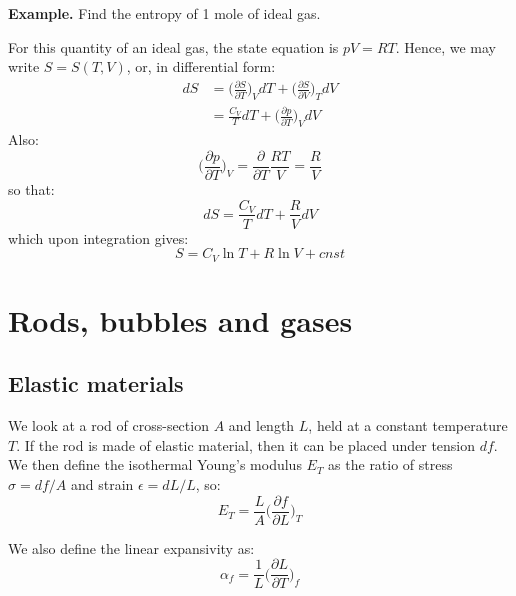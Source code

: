 \documentclass[a4paper,11pt,oneside]{book}
\begin{document}
\begin{strategy}
\textbf{Example.} Find the entropy of 1 mole of ideal gas.
\end{strategy}
\begin{mdframed}
\begin{solution}
For this quantity of an ideal gas, the state equation is $pV = RT$. Hence, we may write $S=S(T,V)$, or, in differential form:
\begin{align}
dS &= \bigg(\frac{\partial S}{\partial T}\bigg)_V dT + \bigg(\frac{\partial S}{\partial V}\bigg)_T dV\\
&= \frac{C_V}{T}dT + \bigg(\frac{\partial p}{\partial T}\bigg)_V dV
\end{align}
Also:
\begin{equation}
    \bigg(\frac{\partial p}{\partial T}\bigg)_V = \frac{\partial}{\partial T} \frac{RT}{V} = \frac{R}{V}
\end{equation}
so that:
\begin{equation}
    dS = \frac{C_V}{T}dT + \frac{R}{V} dV
\end{equation}
which upon integration gives:
\begin{equation}
    S= C_V \ln T + R \ln V + cnst
\end{equation}
\end{solution}
\end{mdframed}

\chapter{Rods, bubbles and gases}
\section{Elastic materials}
We look at a rod of cross-section $A$ and length $L$, held at a constant temperature $T$. If the rod is made of elastic material, then it can be placed under tension $df$. We then define the isothermal Young's modulus $E_T$ as the ratio of stress $\sigma = df/A$ and strain $\epsilon = dL/L$, so:
\begin{equation}
    E_T = \frac{L}{A} \bigg(\frac{\partial f}{\partial L}\bigg)_T
\end{equation}

We also define the linear expansivity as:
\begin{equation}
    \alpha_f= \frac{1}{L}\bigg(\frac{\partial L}{\partial T}\bigg)_f
\end{equation}
\end{document}
